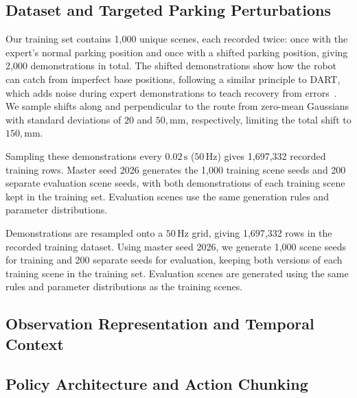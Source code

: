 \documentclass[conference]{IEEEtran}
\begin{document}
\subsection{Dataset and Targeted Parking Perturbations}
Our training set contains 1,000 unique scenes, each recorded twice: once with the expert’s normal parking position and once with a shifted parking position, giving 2,000 demonstrations in total. The shifted demonstrations show how the robot can catch from imperfect base positions, following a similar principle to DART, which adds noise during expert demonstrations to teach recovery from errors~\cite{laskey2017}. We sample shifts along and perpendicular to the route from zero-mean Gaussians with standard deviations of $20$ and $50,\mathrm{mm}$, respectively, limiting the total shift to $150,\mathrm{mm}$.

Sampling these demonstrations every $0.02\,\mathrm{s}$ ($50\,\mathrm{Hz}$) gives 1,697,332 recorded training rows. Master seed 2026 generates the 1,000 training scene seeds and 200 separate evaluation scene seeds, with both demonstrations of each training scene kept in the training set. Evaluation scenes use the same generation rules and parameter distributions.



Demonstrations are resampled onto a $50\,\mathrm{Hz}$ grid, giving 1,697,332 rows in the recorded training dataset. Using master seed 2026, we generate 1,000 scene seeds for training and 200 separate seeds for evaluation, keeping both versions of each training scene in the training set. Evaluation scenes are generated using the same rules and parameter distributions as the training scenes.

\subsection{Observation Representation and Temporal Context}
\subsection{Policy Architecture and Action Chunking}
\end{document}
